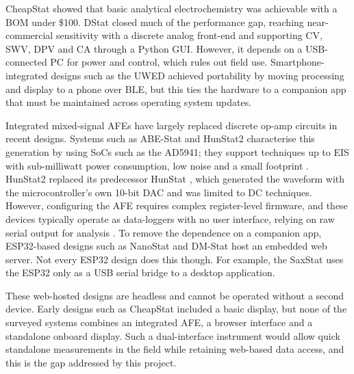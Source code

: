 \label{sec:early_opensource}
\label{sec:general_purpose_opensource}
\label{sec:portable_wireless}

CheapStat \cite{rowe2011} showed that basic analytical electrochemistry was achievable with a \ac{BOM} under \$100. DStat \cite{dryden2015} closed much of the performance gap, reaching near-commercial sensitivity with a discrete analog front-end and supporting CV, SWV, DPV and CA through a Python \ac{GUI}. However, it depends on a USB-connected PC for power and control, which rules out field use. Smartphone-integrated designs such as the UWED \cite{ainla2018} achieved portability by moving processing and display to a phone over \ac{BLE}, but this ties the hardware to a companion app that must be maintained across operating system updates.

\label{sec:eis_afe_designs}
\label{sec:selfhosted_webinterface}

Integrated mixed-signal AFEs have largely replaced discrete op-amp circuits in recent designs. Systems such as ABE-Stat \cite{jenkins2019} and HunStat2 \cite{hunstat2_2025} characterise this generation by using \acp{SoC} such as the AD5941; they support techniques up to EIS with sub-milliwatt power consumption, low noise and a small footprint \cite{hunstat2_2025}. HunStat2 replaced its predecessor HunStat \cite{hunstat2024}, which generated the waveform with the microcontroller's own 10-bit DAC and was limited to DC techniques. However, configuring the AFE requires complex register-level firmware, and these devices typically operate as data-loggers with no user interface, relying on raw serial output for analysis \cite{hunstat2_2025}. To remove the dependence on a companion app, ESP32-based designs such as NanoStat \cite{lee2022} and DM-Stat \cite{dmstat2024} host an embedded web server. Not every ESP32 design does this though. For example, the SaxStat \cite{saxstat2025} uses the ESP32 only as a USB serial bridge to a desktop application.

These web-hosted designs are headless and cannot be operated without a second device. Early designs such as CheapStat included a basic display, but none of the surveyed systems combines an integrated AFE, a browser interface and a standalone onboard display. Such a dual-interface instrument would allow quick standalone measurements in the field while retaining web-based data access, and this is the gap addressed by this project.